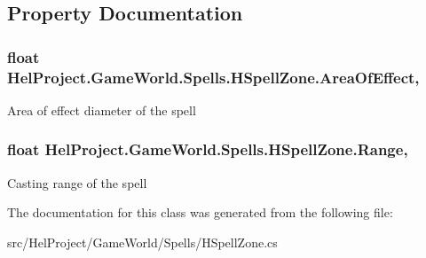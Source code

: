 \subsection{Property Documentation}
\hypertarget{class_hel_project_1_1_game_world_1_1_spells_1_1_h_spell_zone_aa5d5de1c0e032de623b3a9a471f95f3a}{}
\subsubsection[{Area\+Of\+Effect}]{\setlength{\rightskip}{0pt plus 5cm}float Hel\+Project.\+Game\+World.\+Spells.\+H\+Spell\+Zone.\+Area\+Of\+Effect\hspace{0.3cm}{\ttfamily [get]}, {\ttfamily [set]}}\label{class_hel_project_1_1_game_world_1_1_spells_1_1_h_spell_zone_aa5d5de1c0e032de623b3a9a471f95f3a}


Area of effect diameter of the spell 

\hypertarget{class_hel_project_1_1_game_world_1_1_spells_1_1_h_spell_zone_ad3b44aced22248c0aaf4b63e5c62e491}{}
\subsubsection[{Range}]{\setlength{\rightskip}{0pt plus 5cm}float Hel\+Project.\+Game\+World.\+Spells.\+H\+Spell\+Zone.\+Range\hspace{0.3cm}{\ttfamily [get]}, {\ttfamily [set]}}\label{class_hel_project_1_1_game_world_1_1_spells_1_1_h_spell_zone_ad3b44aced22248c0aaf4b63e5c62e491}


Casting range of the spell 



The documentation for this class was generated from the following file\+:\begin{DoxyCompactItemize}
\item 
src/\+Hel\+Project/\+Game\+World/\+Spells/H\+Spell\+Zone.\+cs\end{DoxyCompactItemize}
